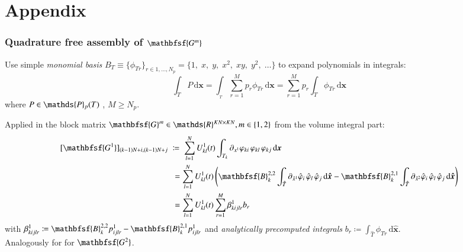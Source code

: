 \documentclass[final,12pt]{beamer}
\newcommand{\IP}{\ensuremath\mathds{P}}
\newcommand{\IR}{\ensuremath\mathds{R}}
\newcommand*{\vphi}{\varphi}                                     %
\renewcommand*{\vec}[1]{{\boldsymbol{#1}}}                       %
\newcommand*{\vecc}[1]{\mathbfsf{#1}}                            %
\newcommand*{\dd}{\mathrm{d}}                                    %
\begin{document}
\appendix
\section*{Appendix}

\begin{frame}
  \frametitle{Quadrature free assembly of $\vecc{G^m}$}
  Use simple \emph{monomial basis} \(B_T^{} \equiv \{\phi_{Tr}^{}\}_{r\in 1,\dots ,N_p} %
  = \{1,\;x,\;y,\;x^2,\;xy,\;y^2,\;\dots\}\)
  to expand polynomials in integrals:
  \begin{equation*}
    \int_{T}P\,\dd\vec{x} = \int_{_T}\sum_{r=1}^Mp_{r}^{}\phi_{Tr}^{}\,\dd\vec{x} = \sum_{r=1}^Mp_{r}^{}\int_T\phi_{Tr}^{}\,\dd\vec{x}
  \end{equation*}
  where \(P\in \IP_p(T)\)%
  , \(M\geq N_p\).
  \vspace*{\fill}

  \pause
  Applied in the block matrix \(\vecc{G}^m \in \IR^{KN\times KN}, m \in \{1,2\}\) from the volume
  integral part:
  \begin{equation*}
    \begin{split}
      [\vecc{G^1}]_{(k-1)N+i,(k-1)N+j} \;&\coloneqq\; \sum_{l=1}^NU_{kl}^1(t)\int_{T_k} \partial_{x^1}\vphi_{ki}\,\vphi_{kl}\,\vphi_{kj}\,\dd\vec{x}\\
      &\;= \sum_{l=1}^NU_{kl}^1(t)\left( \vecc{B}_k^{2,2}\int_{\hat T}\partial_{\hat x^1}\hat \vphi_i\,\hat \vphi_l\,\hat \vphi_j\,\dd\vec{\hat x} - \vecc{B}_k^{2,1}\int_{\hat T}\partial_{\hat x^2}\hat \vphi_i\,\hat \vphi_l\,\hat \vphi_j\,\dd\vec{\hat x} \right)\\
      &\;= \sum_{l=1}^NU_{kl}^1(t)\sum_{r=1}^M \beta_{kijlr}^1 b_r
    \end{split}
  \end{equation*}
  with \(\beta_{kijlr}^1 \coloneqq \vecc{B}_k^{2,2}p_{ijlr}^1 - \vecc{B}_k^{2,1}p_{ijlr}^1\)\;
  and \emph{analytically precomputed integrals}
  \(b_r \coloneqq \int_{\hat{T}}\phi_{\hat{T}r}^{}\,\dd\vec{\hat{x}} \).\\
  Analogously for  for \(\vecc{G^2}\).
\end{frame}
\end{document}
